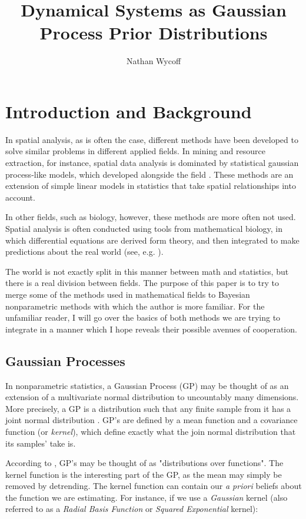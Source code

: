 \documentclass{article}
\title{Dynamical Systems as Gaussian Process \newline Prior Distributions}
\author{Nathan Wycoff}
\begin{document}
	
	\maketitle
	
	\section{Introduction and Background}
	
	In spatial analysis, as is often the case, different methods have been developed to solve similar problems in different applied fields. In mining and resource extraction, for instance, spatial data analysis is dominated by statistical gaussian process-like models, which developed alongside the field \cite{Krige51}. These methods are an extension of simple linear models in statistics that take spatial relationships into account.
	
	In other fields, such as biology, however, these methods are more often not used. Spatial analysis is often conducted using tools from mathematical biology, in which differential equations are derived form theory, and then integrated to make predictions about the real world (see, e.g. \cite{mathbio2}).
	 
	The world is not exactly split in this manner between math and statistics, but there is a real division between fields. The purpose of this paper is to try to merge some of the methods used in mathematical fields to Bayesian nonparametric methods with which the author is more familiar. For the unfamiliar reader, I will go over the basics of both methods we are trying to integrate in a manner which I hope reveals their possible avenues of cooperation.
	 
	 \subsection{Gaussian Processes}
	 
	 In nonparametric statistics, a Gaussian Process (GP) may be thought of as an extension of a multivariate normal distribution to uncountably many dimensions. More precisely, a GP is a distribution such that any finite sample from it has a joint normal distribution \cite{GPforML}. GP's are defined by a mean function and a covariance function (or \textit{kernel}), which define exactly what the join normal distribution that its samples' take is. 
	 
	 According to \cite{GPforML}, GP's may be thought of as "distributions over functions". The kernel function is the interesting part of the GP, as the mean may simply be removed by detrending. The kernel function can contain our \textit{a priori} beliefs about the function we are estimating. For instance, if we use a \textit{Gaussian} kernel (also referred to as a \textit{Radial Basis Function} or \textit{Squared Exponential} kernel):
	 
\end{document}
